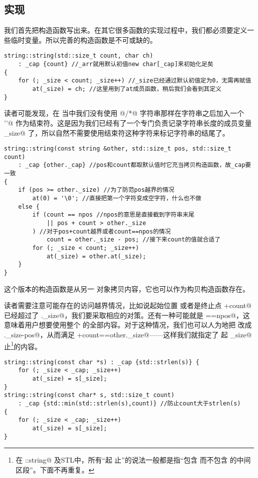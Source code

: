 \subsection*{实现}
我们首先把构造函数写出来。在其它很多函数的实现过程中，我们都必须要定义一些临时变量。所以完善的构造函数是不可或缺的。\par
\begin{lstlisting}
string::string(std::size_t count, char ch)
    : _cap {count} //_arr就用默认初值new char[_cap]来初始化足矣
{
    for (; _size < count; _size++) //_size已经通过默认初值定为0，无需再赋值
        at(_size) = ch; //这里用到了at成员函数，稍后我们会看到其定义
}
\end{lstlisting}
读者可能发现，在 \lstinline@string@ 当中我们没有使用 \lstinline@char[]@/\lstinline@char*@ 字符串那样在字符串之后加入一个 \lstinline@'\0'@ 作为结束符。这是因为我们已经有了一个专门负责记录字符串长度的成员变量 \lstinline@_size@ 了，所以自然不需要使用结束符这种字符来标记字符串的结尾了。
\begin{lstlisting}
string::string(const string &other, std::size_t pos, std::size_t count)
    : _cap {other._cap} //pos和count都取默认值时它充当拷贝构造函数，故_cap要一致
{
    if (pos >= other._size) //为了防范pos越界的情况
        at(0) = '\0'; //直接把第一个字符变成空字符，什么也不做
    else {
        if (count == npos //npos的意思是直接截到字符串末尾
            || pos + count > other._size
        ) //对于pos+count越界或者count==npos的情况
            count = other._size - pos; //接下来count的值就合适了
        for (; _size < count; _size++)
            at(_size) = other.at(_size);
    }
}
\end{lstlisting}
这个版本的构造函数是从另一 \lstinline@string@ 对象拷贝内容，它也可以作为构贝构造函数存在。\par
读者需要注意可能存在的访问越界情况，比如说起始位置 \lstinline@pos@ 或者是终止点 \lstinline@pos+count@ 已经超过了 \lstinline@other._size@，我们要采取相应的对策。还有一种可能就是 \lstinline@count==npos@，这意味着用户想要使用整个 \lstinline@string@ 的全部内容。对于这种情况，我们也可以人为地把 \lstinline@count@ 改成 \lstinline@other._size-pos@，从而满足 \lstinline@pos+count==other._size@——这样我们就指定了 \lstinline@pos@ 起 \lstinline@_size@ 止\footnote{在 \lstinline@std::string@ 及STL中，所有``\lstinline@a@ 起 \lstinline@b@ 止''的说法一般都是指``包含 \lstinline@a@ 而不包含 \lstinline@b@ 的中间区段''。下面不再重复。}的内容。
\begin{lstlisting}
string::string(const char *s) : _cap {std::strlen(s)} {
    for (; _size < _cap; _size++)
        at(_size) = s[_size];
}
string::string(const char* s, std::size_t count)
    : _cap {std::min(std::strlen(s),count)} //防止count大于strlen(s)
{
    for (; _size < _cap; _size++)
        at(_size) = s[_size];
}
\end{lstlisting}
